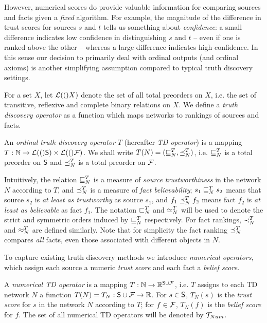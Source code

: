 However, numerical scores do provide valuable information for comparing sources
and facts given a \emph{fixed} algorithm. For example, the magnitude of the
difference in trust scores for sources $s$ and $t$ tells us something about
\emph{confidence}: a small difference indicates low confidence in
distinguishing $s$ and $t$ -- even if one is ranked above the other -- whereas
a large difference indicates high confidence. In this sense our decision to
primarily deal with ordinal outputs (and ordinal axioms) is another simplifying
assumption compared to typical truth discovery settings.

For a set $X$, let $\orderings(X)$ denote the set of all total preorders on
$X$, i.e. the set of transitive, reflexive and complete binary relations on
$X$. We define a \emph{truth discovery operator} as a
function which maps networks to rankings of sources and facts.

\begin{definition}
\label{td_def_truth_discovery_operator}

An \emph{ordinal truth discovery operator} $T$ (hereafter {\em TD operator}) is
a mapping $T: \N \to \orderings(\S)
\times \orderings(\F)$. We shall write $T(N) = (\sle_N^T, \fle_N^T)$, i.e.
$\sle_N^T$ is a total preorder on $\S$ and $\fle_N^T$ is a total preorder on
$\F$.
\end{definition}

Intuitively, the relation $\sle_N^T$ is a measure of \emph{source
trustworthiness} in the network $N$ according to $T$, and $\fle_N^T$ is a
measure of \emph{fact believability}; $s_1 \sle_N^T s_2$ means that source
$s_2$ is \emph{at least as trustworthy} as source $s_1$, and $f_1 \fle_N^T f_2$
means fact $f_2$ is \emph{at least as believable} as fact $f_1$. The notation
$\slt_N^T$ and $\seq_N^T$ will be used to denote the strict and symmetric
orders induced by $\sle_N^T$ respectively. For fact rankings, $\flt_N^T$ and
$\feq_N^T$ are defined similarly.
%
Note that for simplicity the fact ranking $\fle_N^T$ compares \emph{all} facts,
even those associated with different objects in $N$.

To capture existing truth discovery methods we introduce \emph{numerical
operators}, which assign each source a numeric \emph{trust score} and each fact
a \emph{belief score}.

\begin{definition}
A \emph{numerical TD operator} is a mapping $T: \N \to \R^{\S \cup
\F}$, i.e. $T$ assigns to each TD network $N$ a
function $T(N) = T_N: \S \cup \F \to \R$.
For $s \in \S$, $T_N(s)$ is the \emph{trust score} for $s$ in the
network $N$ according to $T$; for $f \in \F$, $T_N(f)$ is the \emph{belief
score} for $f$. The set of all numerical TD operators will be denoted by
$\num$.

\end{definition}

